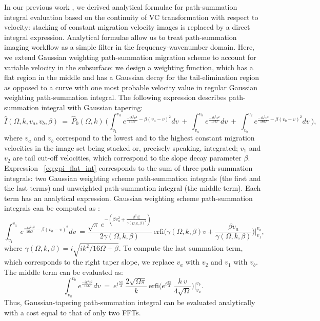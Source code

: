 In our previous work \cite[]{merzlikin17}, we derived analytical formulae
for path-summation integral evaluation based on the continuity of VC transformation with respect
to velocity: stacking of constant migration velocity images
is replaced by a direct integral expression. Analytical formulae
allow us to treat path-summation imaging workflow as a simple
filter in the frequency-wavenumber domain. Here, we extend Gaussian weighting path-summation migration scheme
\cite[]{merzlikin17} to account for variable velocity in the subsurface:
we design a weighting function, which has a flat region in the middle and has a
Gaussian decay for the tail-elimination region as opposed
to a curve with one most probable velocity value in regular
Gaussian weighting path-summation integral. The following expression describes path-summation integral with Gaussian tapering:
\begin{equation}
\label{eq:gpi_flat_int}
\hat{I}(\Omega,k,v_a,v_b,\beta)\ =\ \hat{P}_0(\Omega,k)\ \Big( \int^{v_a}_{v_1} e^{\frac{-i k^2 v^2}{16\Omega} - \beta(v_{a} - v)^2} dv\ 
    +\ \int^{v_b}_{v_a}e^{\frac{-i k^2 v^2}{16\Omega}} dv\ +\ \int^{v_2}_{v_b} e^{\frac{-i k^2 v^2}{16\Omega} - \beta(v_{b} - v)^2} dv\ \Big),
\end{equation}
where $v_a$ and $v_b$ correspond to the lowest and to the highest constant migration
velocities in the image set being stacked or, precisely speaking, integrated; $v_1$ and $v_2$ are
tail cut-off velocities, which correspond to the slope decay parameter $\beta$. Expression ~\ref{eq:gpi_flat_int} 
corresponds to the sum of three path-summation integrals: two Gaussian weighting scheme path-summation integrals (the first and
the last terms) and unweighted path-summation integral (the middle term).
Each term has an analytical expression.
Gaussian weighting scheme path-summation integrals can be computed as \cite[]{merzlikin17}:
\begin{equation}
\label{eq:gpi_filt}
\int^{v_a}_{v_1}\ e^{\frac{-i k^2 v^2}{16\Omega} - \beta(v_{a} - v)^2} dv\ =
\frac{\sqrt{\pi}\ e^{-(\beta v_{a}^2 + \frac{\beta^2 v_{a}^2}{\gamma(\Omega,k,\beta)^2})}}{ 2\gamma(\Omega,k,\beta) }\ \mbox{erfi}\big( \gamma(\Omega,k,\beta) v + \frac{\beta v_{a}}{\gamma(\Omega,k,\beta)} \big) \bigg|_{v_1}^{v_a}, 
\end{equation}
where $\gamma(\Omega,k,\beta)=i\sqrt{ik^2/16\Omega + \beta}$. To compute the last summation term,
which corresponds to the right taper slope, we
replace $v_a$ with $v_2$ and $v_1$ with $v_b$. The middle term can be evaluated as:
\begin{equation}
\label{eq:upi_filt}
\int^{v_b}_{v_a}e^{\frac{-i k^2 v^2}{16\Omega}} dv\ =\
e^{i\frac{5\pi}{4}}\ \frac{2\sqrt{\Omega \pi}}{k}\ \mbox{erfi}\big(e^{i\frac{3\pi}{4}}\ \frac{k\ v}{4\sqrt{\Omega}}\big) \bigg|_{v_a}^{v_b}. 
\end{equation}
Thus, Gaussian-tapering path-summation integral can be evaluated analytically with a cost equal to that of only two FFTs.

